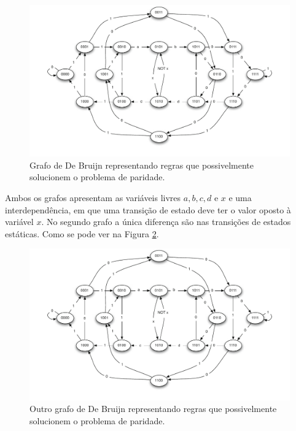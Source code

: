 \documentclass[12pt,a4paper]{article}
\begin{document}
	\begin{figure}[h!]
	  \centering
	  \includegraphics[width=1\textwidth]{grafo1.pdf}
        \caption{Grafo de De Bruijn representando regras que possivelmente solucionem o problema de paridade.}
        \label{fig:grafosDeBruijn}
	\end{figure}

	Ambos os grafos apresentam as variáveis livres $a, b, c, d \text{ e } x$ e uma interdependência, em que uma transição de estado deve ter o valor oposto à variável $x$. No segundo grafo a única diferença são nas transições de estados estáticas. Como se pode ver na Figura \ref{fig:grafosDeBruijn2}.

	\begin{figure}[h!]
	  \centering
	  \includegraphics[width=1\textwidth]{grafo2.pdf}
        \caption{Outro grafo de De Bruijn representando regras que possivelmente solucionem o problema de paridade.}
        \label{fig:grafosDeBruijn2}
	\end{figure}
\end{document}
